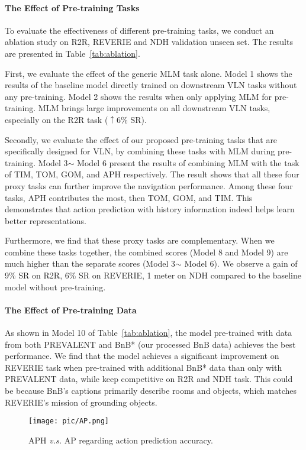 \documentclass[10pt,twocolumn,letterpaper]{article}
\begin{document}
\paragraph{The Effect of Pre-training Tasks}
To evaluate the effectiveness of different pre-training tasks, we conduct an ablation study on R2R, REVERIE and NDH validation unseen set. The results are presented in Table~\ref{tab:ablation}.

First, we evaluate the effect of the generic MLM task alone. Model 1 shows the results of the baseline model directly trained on downstream VLN tasks without any pre-training. Model 2 shows the results when only applying MLM for pre-training. MLM brings large improvements on all downstream VLN tasks, especially on the R2R task ($\uparrow 6\% $ SR). 

Secondly, we evaluate the effect of our proposed pre-training tasks that are specifically designed for VLN, by combining these tasks with MLM during pre-training. 
Model 3$\sim$ Model 6 present the results of combining MLM with the task of TIM, TOM, GOM, and APH respectively. The result shows that all these four proxy tasks can further improve the navigation performance.
Among these four tasks, APH contributes the most, then TOM, GOM, and TIM. 
This demonstrates that action prediction with history information indeed helps learn better representations.

Furthermore, we find that these proxy tasks are complementary. When we combine these tasks together, the combined scores (Model 8 and Model 9) are much higher than the separate scores (Model 3$\sim$ Model 6).
We observe a gain of 9\% SR on R2R, 6\% SR on REVERIE, 1 meter on NDH compared to the baseline model without pre-training.

\vspace{-3pt}
\paragraph{The Effect of Pre-training Data}
As shown in Model 10 of Table~\ref{tab:ablation}, the model pre-trained with data from both PREVALENT and BnB* (our processed BnB data) achieves the best performance. 
We find that the model achieves a significant improvement on REVERIE task when pre-trained with additional BnB* data than only with PREVALENT data, while keep competitive on R2R and NDH task.
This could be because BnB's captions primarily describe rooms and objects, which matches REVERIE's mission of grounding objects.

\begin{figure}[!t]
	\begin{center}
		\texttt{[image: pic/AP.png]}
	\end{center}
	\vspace{-10pt}
	\caption{APH \textit{v.s.} AP regarding action prediction accuracy.
	}
	\label{fig:AP}
	\vspace{-7pt}
\end{figure}
\end{document}
